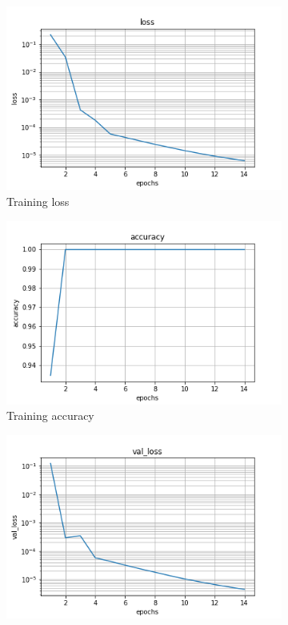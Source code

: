\documentclass{article}
\begin{document}
\begin{figure}
\centering
\begin{subfigure}[b]{0.45\textwidth}
    \centering
    \includegraphics[totalheight=4cm]{circle_id/binary/plotloss.png}
    \caption{Training loss}
  \end{subfigure}
%
\begin{subfigure}[b]{0.45\textwidth}
    \centering
    \includegraphics[totalheight=4cm]{circle_id/binary/plotaccuracy.png}
    \caption{Training accuracy}
  \end{subfigure}
%
\begin{subfigure}[b]{0.45\textwidth}
    \centering
    \includegraphics[totalheight=4cm]{circle_id/binary/plotval_loss.png}

\end{subfigure}
\end{figure}
\end{document}
